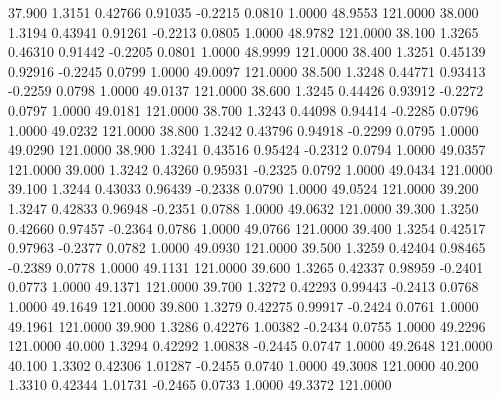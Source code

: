   37.900   1.3151   0.42766   0.91035  -0.2215   0.0810   1.0000  48.9553 121.0000
  38.000   1.3194   0.43941   0.91261  -0.2213   0.0805   1.0000  48.9782 121.0000
  38.100   1.3265   0.46310   0.91442  -0.2205   0.0801   1.0000  48.9999 121.0000
  38.400   1.3251   0.45139   0.92916  -0.2245   0.0799   1.0000  49.0097 121.0000
  38.500   1.3248   0.44771   0.93413  -0.2259   0.0798   1.0000  49.0137 121.0000
  38.600   1.3245   0.44426   0.93912  -0.2272   0.0797   1.0000  49.0181 121.0000
  38.700   1.3243   0.44098   0.94414  -0.2285   0.0796   1.0000  49.0232 121.0000
  38.800   1.3242   0.43796   0.94918  -0.2299   0.0795   1.0000  49.0290 121.0000
  38.900   1.3241   0.43516   0.95424  -0.2312   0.0794   1.0000  49.0357 121.0000
  39.000   1.3242   0.43260   0.95931  -0.2325   0.0792   1.0000  49.0434 121.0000
  39.100   1.3244   0.43033   0.96439  -0.2338   0.0790   1.0000  49.0524 121.0000
  39.200   1.3247   0.42833   0.96948  -0.2351   0.0788   1.0000  49.0632 121.0000
  39.300   1.3250   0.42660   0.97457  -0.2364   0.0786   1.0000  49.0766 121.0000
  39.400   1.3254   0.42517   0.97963  -0.2377   0.0782   1.0000  49.0930 121.0000
  39.500   1.3259   0.42404   0.98465  -0.2389   0.0778   1.0000  49.1131 121.0000
  39.600   1.3265   0.42337   0.98959  -0.2401   0.0773   1.0000  49.1371 121.0000
  39.700   1.3272   0.42293   0.99443  -0.2413   0.0768   1.0000  49.1649 121.0000
  39.800   1.3279   0.42275   0.99917  -0.2424   0.0761   1.0000  49.1961 121.0000
  39.900   1.3286   0.42276   1.00382  -0.2434   0.0755   1.0000  49.2296 121.0000
  40.000   1.3294   0.42292   1.00838  -0.2445   0.0747   1.0000  49.2648 121.0000
  40.100   1.3302   0.42306   1.01287  -0.2455   0.0740   1.0000  49.3008 121.0000
  40.200   1.3310   0.42344   1.01731  -0.2465   0.0733   1.0000  49.3372 121.0000

